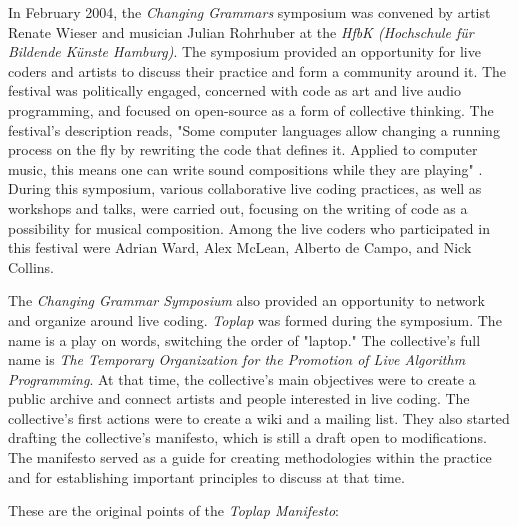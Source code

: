 \documentclass[12pt, twoside, a4paper]{report}
\begin{document}
In February 2004, the \textit{Changing Grammars} symposium was convened by artist Renate Wieser and musician Julian Rohrhuber at the \textit{HfbK (Hochschule für Bildende Künste Hamburg)}. The symposium provided an opportunity for live coders and artists to discuss their practice and form a community around it.  The festival was politically engaged, concerned with code as art and live audio programming, and focused on open-source as a form of collective thinking. The festival's description reads, "Some computer languages allow changing a running process on the fly by rewriting the code that defines it. Applied to computer music, this means one can write sound compositions while they are playing" \citep{grammars}.
 During this symposium, various collaborative live coding practices, as well as workshops and talks, were carried out, focusing on the writing of code as a possibility for musical composition. Among the live coders who participated in this festival were Adrian Ward, Alex McLean, Alberto de Campo, and Nick Collins.

The \textit{Changing Grammar Symposium} also provided an opportunity to network and organize around live coding. \textit{Toplap} was formed during the symposium. The name is a play on words, switching the order of "laptop." The collective's full name is \textit{The Temporary Organization for the Promotion of Live Algorithm Programming}. At that time, the collective's main objectives were to create a public archive and connect artists and people interested in live coding. The collective's first actions were to create a wiki and a mailing list. They also started drafting the collective's manifesto, which is still a draft open to modifications. The manifesto served as a guide for creating methodologies within the practice and for establishing important principles to discuss at that time. 

These are the original points of the \textit{Toplap Manifesto}:
\end{document}
